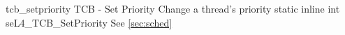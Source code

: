 %
%
%
%

\apidoc
{tcb_setpriority}
{TCB - Set Priority}
{Change a thread's priority}
{static inline int seL4\_TCB\_SetPriority }
{
}
{\errorenumdesc}
{See \autoref{sec:sched}}
